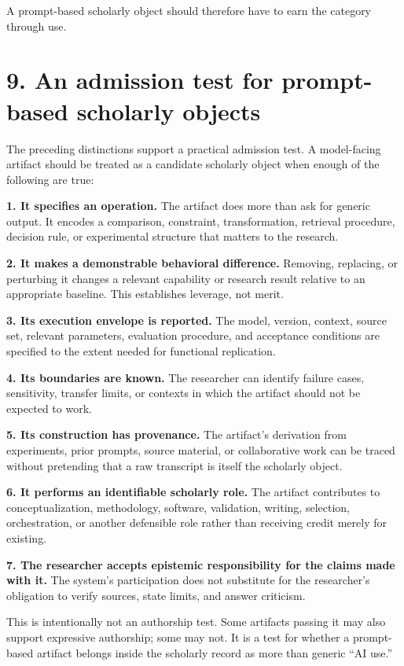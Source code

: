 \documentclass[
]{article}
\begin{document}
A prompt-based scholarly object should therefore have to earn the
category through use.

\section{9. An admission test for prompt-based scholarly
objects}\label{an-admission-test-for-prompt-based-scholarly-objects}

The preceding distinctions support a practical admission test. A
model-facing artifact should be treated as a candidate scholarly object
when enough of the following are true:

\textbf{1. It specifies an operation.} The artifact does more than ask
for generic output. It encodes a comparison, constraint, transformation,
retrieval procedure, decision rule, or experimental structure that
matters to the research.

\textbf{2. It makes a demonstrable behavioral difference.} Removing,
replacing, or perturbing it changes a relevant capability or research
result relative to an appropriate baseline. This establishes leverage,
not merit.

\textbf{3. Its execution envelope is reported.} The model, version,
context, source set, relevant parameters, evaluation procedure, and
acceptance conditions are specified to the extent needed for functional
replication.

\textbf{4. Its boundaries are known.} The researcher can identify
failure cases, sensitivity, transfer limits, or contexts in which the
artifact should not be expected to work.

\textbf{5. Its construction has provenance.} The artifact's derivation
from experiments, prior prompts, source material, or collaborative work
can be traced without pretending that a raw transcript is itself the
scholarly object.

\textbf{6. It performs an identifiable scholarly role.} The artifact
contributes to conceptualization, methodology, software, validation,
writing, selection, orchestration, or another defensible role rather
than receiving credit merely for existing.

\textbf{7. The researcher accepts epistemic responsibility for the
claims made with it.} The system's participation does not substitute for
the researcher's obligation to verify sources, state limits, and answer
criticism.

This is intentionally not an authorship test. Some artifacts passing it
may also support expressive authorship; some may not. It is a test for
whether a prompt-based artifact belongs inside the scholarly record as
more than generic ``AI use.''
\end{document}
